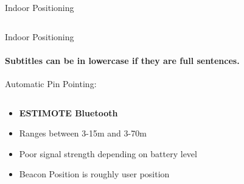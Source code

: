 \documentclass[11pt]{beamer}
\begin{document}
\begin{frame}{Indoor Positioning}
\begin{columns}[T]
\begin{column}{.4\textwidth}
  \end{column}
\end{columns}

\end{frame}


\begin{frame}{Indoor Positioning}

\framesubtitle{Subtitles can be in lowercase if they are full sentences.}
Automatic Pin Pointing:

  \begin{columns}[T]

    \begin{column}{.6\textwidth}

      \begin{itemize}
        \item \textbf{ESTIMOTE Bluetooth} \\
        \item Ranges between 3-15m and 3-70m
        \item Poor signal strength depending on battery level
        \item Beacon Position is roughly user position
      \end{itemize}

    \end{column}


\end{columns}
\end{frame}
\end{document}
